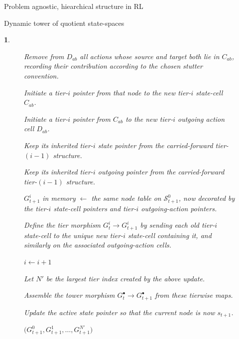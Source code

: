 \documentclass[11pt]{article}
\newtheorem{ermark}[subsubsection]{}
\begin{document}
\begin{section}{Problem agnostic, hiearchical structure in RL}
\begin{subsection}{Dynamic tower of quotient state-spaces}
\begin{ermark}
\begin{figure}[!h]
\begin{algorithm}[H]
\begin{algorithmic}[1]
                \State Remove from $D_{ab}$ all actions whose source and target both lie in $C_{ab}$, recording their contribution according to the chosen stutter convention.

                    \State Initiate a tier-$i$ pointer from that node to the new tier-$i$ state-cell $C_{ab}$.
                \EndFor

                \State Initiate a tier-$i$ pointer from $C_{ab}$ to the new tier-$i$ outgoing action cell $D_{ab}$.
            \EndIf
        \EndFor

                \State Keep its inherited tier-$i$ state pointer from the carried-forward tier-$(i-1)$ structure.
            \EndIf

                \State Keep its inherited tier-$i$ outgoing pointer from the carried-forward tier-$(i-1)$ structure.
            \EndIf
        \EndFor

        \State $G_{t+1}^i$ in memory $\gets$ the same node table on $\mathcal{S}_{t+1}^0$, now decorated by the tier-$i$ state-cell pointers and tier-$i$ outgoing-action pointers.

        \State Define the tier morphism
        $
        G_t^i \longrightarrow G_{t+1}^i
        $
        by sending each old tier-$i$ state-cell to the unique new tier-$i$ state-cell containing it, and similarly on the associated outgoing-action cells.

        \State $i \gets i+1$

    \EndWhile

    \State Let $N'$ be the largest tier index created by the above update.

    \State Assemble the tower morphism
    $
    G_t^\bullet \longrightarrow G_{t+1}^\bullet
    $
    from these tierwise maps.

    \State Update the active state pointer so that the current node is now $s_{t+1}$.

    \State \Return $\bigl(
    G_{t+1}^0,G_{t+1}^1,\dots,G_{t+1}^{N'}
    \bigr)$
\EndFunction

\end{algorithmic}
\end{algorithm}
    \label{fig: algorithm 2}
\end{figure}

\end{ermark}

\end{subsection}

\end{section}
\end{document}
